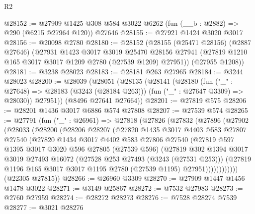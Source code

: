 \begin{lexlean}{R2}
\begin{coremodule}
@28152 := @27909 @1425 @308 @584 @3022 @6262 (fun (__b : @2882) => @290 (@6215 @27964 @120)) @27646
@28155 := @27921 @1424 @3020 @3017
@28156 := @20098 @2780
@28180 := @28152
    (@28155
      (@25471 @28156)
      (@2887 @27646)
      (@27931
        @1423
        @3017
        @3019
        @25470
        @28156
        @27941
        (@27819 @1210 @165 @3017 @3017 @1209 @2780 (@27539 @1209) @27951))
      (@27955 @1208))
@28181 := @3238 @28023
@28183 := @28181 @263 @27965
@28184 := @3244 @28023
@28200 := @28039
    (@28051
      (@28135
        (@28141
          (@28180
            (fun ("_" : @27648) => @28183 (@3243 (@28184 @263)))
            (fun ("_" : @27647 @3309) => @28030))
          @27951))
      (@8496 @27641 @27664))
@28201 := @27819 @575
@28206 := @28201 @1436 @3017 @6886 @574 @27808
@28207 := @27539 @574
@28265 := @27791
    (fun ("_" : @26961) =>
    @27818
      (@27826
        (@27832
          (@27896
            (@27902
              (@28033
                (@28200
                  (@28206
                    @28207
                    (@27820
                      @1435
                      @3017
                      @4403
                      @583
                      @27807
                      @27540
                      (@27820
                        @1434
                        @3017
                        @4402
                        @583
                        @27806
                        @27540
                        (@27819
                          @597
                          @1395
                          @3017
                          @3020
                          @596
                          @27805
                          (@27539 @596)
                          (@27819
                            @302
                            @1394
                            @3017
                            @3019
                            @27493
                            @16072
                            (@27528 @253 @27493 (@3243 (@27531 @253)))
                            (@27819
                              @1196
                              @165
                              @3017
                              @3017
                              @1195
                              @2780
                              (@27539 @1195)
                              @27951))))))))))))
      (@22305 @27815))
@28266 := @26960 @3309
@28270 := @27909 @1447 @1456 @1478 @3022
@28271 := @3149 @25867
@28272 := @7532 @27983
@28273 := @2760 @27959
@28274 := @28272 @28273
@28276 := @7528 @28274 @7539
@28277 := @3021 @28276

\end{coremodule}
\end{lexlean}
